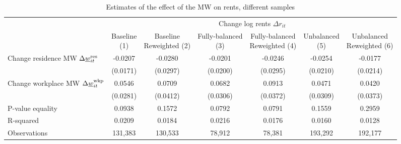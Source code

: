 \begin{landscape}
\begin{table}[hbt!]
    \centering
    \caption{Estimates of the effect of the MW on rents, different samples}
    \label{tab:static_sample}

    \begin{tabular}{@{}lcccccc@{}}
        \toprule
                                             & \multicolumn{6}{c}{Change log rents $\Delta r_{it}$}                   \\ \cmidrule(l){2-7} 
                                             & \shortstack{Baseline\\(1)}       & \shortstack{Baseline\\Reweighted (2)}
                                             & \shortstack{Fully-balanced\\(3)} & \shortstack{Fully-balanced\\Reweighted (4)}  
                                             & \shortstack{Unbalanced\\(5)}     & \shortstack{Unbalanced\\Reweighted (6)}  \\ \midrule
        Change residence MW 
                  $\Delta\underline{w}_{it}^{\text{res}}$    & -0.0207      & -0.0280        & -0.0201       & -0.0246    & -0.0254       & -0.0177     \\
                                             & (0.0171)    & (0.0297)      & (0.0200)     & (0.0295)  & (0.0210)     & (0.0214)   \\
        Change workplace MW 
                   $\Delta\underline{w}_{it}^{\text{wkp}}$   & 0.0546      & 0.0709        & 0.0682       & 0.0913    & 0.0471       & 0.0420     \\
                                             & (0.0281)    & (0.0412)      & (0.0306)     & (0.0372)  & (0.0309)     & (0.0373)   \\ \midrule
        P-value equality                     & 0.0938      & 0.1572        & 0.0792       & 0.0791    & 0.1559       & 0.2959     \\
        R-squared                            & 0.0209      & 0.0184        & 0.0216       & 0.0176    & 0.0160       & 0.0128     \\
        Observations                         & 131,383     & 130,533       & 78,912      & 78,381   & 193,292      & 192,177    \\ \bottomrule
    \end{tabular}


\end{table}
\end{landscape}
